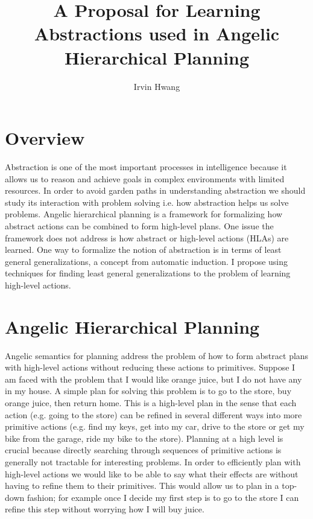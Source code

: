 \documentclass[a4paper,12pt]{article}
\begin{document}
\title{A Proposal for Learning Abstractions used in Angelic Hierarchical Planning}
\author{Irvin Hwang}
\maketitle

\section{Overview}
Abstraction is one of the most important processes in intelligence because it allows us to reason and achieve goals in complex environments with limited resources.  In order to avoid garden paths in understanding abstraction we should study its interaction with problem solving i.e. how abstraction helps us solve problems.  Angelic hierarchical planning is a framework for formalizing how abstract actions can be combined to form high-level plans.  One issue the framework does not address is how abstract or high-level actions (HLAs) are learned.  One way to formalize the notion of abstraction is in terms of least general generalizations, a concept from automatic induction.  I propose using techniques for finding least general generalizations to the problem of learning high-level actions.

\section{Angelic Hierarchical Planning}
Angelic semantics for planning address the problem of how to form abstract plans with high-level actions without reducing these actions to primitives.  Suppose I am faced with the problem that I would like orange juice, but I do not have any in my house.  A simple plan for solving this problem is to go to the store, buy orange juice, then return home.  This is a high-level plan in the sense that each action (e.g. going to the store) can be refined in several different ways into more primitive actions (e.g. find my keys, get into my car, drive to the store or get my bike from the garage, ride my bike to the store).  Planning at a high level is crucial because directly searching through sequences of primitive actions is generally not tractable for interesting problems.  In order to efficiently plan with high-level actions we would like to be able to say what their effects are without having to refine them to their primitives.  This would allow us to plan in a top-down fashion; for example once I decide my first step is to go to the store I can refine this step without worrying how I will buy juice. 
\end{document}
